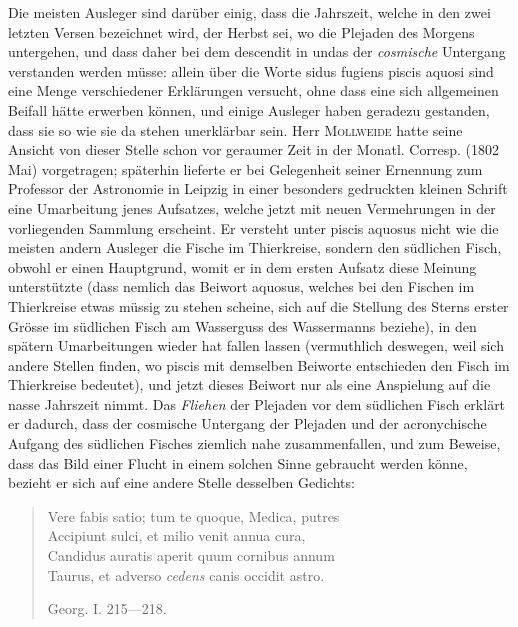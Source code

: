 Die meisten Ausleger sind darüber einig, dass die Jahrszeit, welche in den zwei letzten Versen bezeichnet wird, der Herbst sei, wo die Plejaden des Morgens untergehen, und dass daher bei dem descendit in undas der \emph{cosmische} Untergang verstanden werden müsse: allein über die Worte sidus fugiens piscis aquosi sind eine Menge verschiedener Erklärungen versucht, ohne dass eine sich allgemeinen Beifall hätte erwerben können, und einige Ausleger haben geradezu gestanden, dass sie so wie sie da stehen unerklärbar sein. Herr \textsc{Mollweide} hatte seine Ansicht von dieser Stelle schon vor geraumer Zeit in der Monatl. Corresp. (1802 Mai) vorgetragen; späterhin lieferte er bei Gelegenheit seiner Ernennung zum Professor der Astronomie in Leipzig in einer besonders gedruckten kleinen Schrift eine Umarbeitung jenes Aufsatzes, welche jetzt mit neuen Vermehrungen in der vorliegenden Sammlung erscheint. Er versteht unter piscis aquosus nicht wie die meisten andern Ausleger die Fische im Thierkreise, sondern den südlichen Fisch, obwohl er einen Hauptgrund, womit er in dem ersten Aufsatz diese Meinung unterstützte (dass nemlich das Beiwort aquosus, welches bei den Fischen im Thierkreise etwas müssig zu stehen scheine, sich auf die Stellung des Sterns erster Grösse im südlichen Fisch am Wasserguss des Wassermanns beziehe), in den spätern Umarbeitungen wieder hat fallen lassen (vermuthlich deswegen, weil sich andere Stellen finden, wo piscis mit demselben Beiworte entschieden den Fisch im Thierkreise bedeutet), und jetzt dieses Beiwort nur als eine Anspielung auf die nasse Jahrszeit nimmt. Das \emph{Fliehen} der Plejaden vor dem südlichen Fisch erklärt er dadurch, dass der cosmische Untergang der Plejaden und der acronychische Aufgang des südlichen Fisches ziemlich nahe zusammenfallen, und zum Beweise, dass das Bild einer Flucht in einem solchen Sinne gebraucht werden könne, bezieht er sich auf eine andere Stelle desselben Gedichts:

\begin{quote}\small Vere fabis satio; tum te quoque, Medica, putres \\ Accipiunt sulci, et milio venit annua cura, \\ Candidus auratis aperit quum cornibus annum \\ Taurus, et adverso \emph{cedens} canis occidit astro.

\hfill Georg. I. 215---218. \end{quote}

